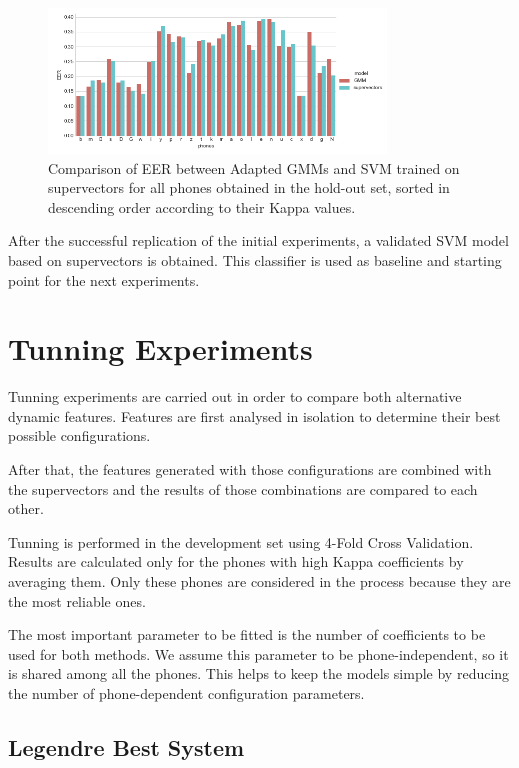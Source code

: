 \begin{figure}[H]
	\centering
	\includegraphics[width=0.8\textwidth]{files/figures/results/gmm-vs-supervectors/gmm-vs-supervectors-heldout.png}
	\caption{Comparison of EER between Adapted GMMs
	and SVM trained on supervectors for all phones obtained in the
	hold-out set, sorted in descending order according to their Kappa values.}
	\label{fig:gmmSupervectorsTest}
\end{figure}

After the successful replication of the initial experiments, a validated SVM model based on
supervectors is obtained. This classifier is used as baseline and starting point for
the next experiments.

\section{Tunning Experiments}

Tunning experiments are carried out in order to compare both alternative
dynamic features. Features are first analysed in isolation to
determine their best possible configurations.

After that, the features generated with those configurations are combined with
the supervectors and the results of those combinations are compared to each other.

Tunning is performed in the development set using 4-Fold Cross Validation. Results are
calculated only for the phones with high Kappa coefficients by averaging them.
Only these phones are considered in the process because they are the most reliable ones.

The most important parameter to be fitted is the number of coefficients to be used
for both methods. We assume this parameter to be phone-independent,
so it is shared
among all the phones. This helps to keep
the models simple by reducing the number of phone-dependent configuration parameters.

\subsection{Legendre Best System}

